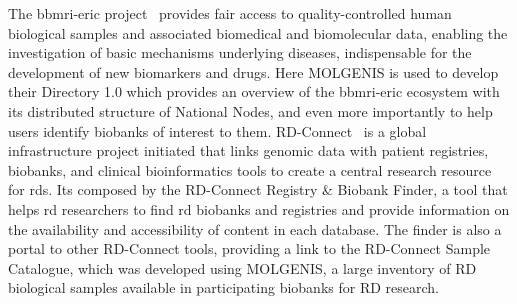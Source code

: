 The \gls{bbmri-eric} project~\cite{bbmrieric} provides fair access to
quality-controlled human biological samples and associated biomedical and biomolecular
data, enabling the investigation of basic mechanisms underlying diseases, indispensable
for the development of new biomarkers and drugs.
Here MOLGENIS is used to develop their Directory 1.0 which provides an overview of the
\gls{bbmri-eric} ecosystem with its distributed structure of National Nodes, and even more
importantly to help users identify biobanks of interest to them.
RD-Connect~\cite{rdconnect} is a global infrastructure project initiated that links
genomic data with patient registries, biobanks, and clinical bioinformatics tools to
create a central research resource for \gls{rd}s.
Its composed by the RD-Connect Registry \& Biobank Finder, a tool that helps \gls{rd}
researchers to find \gls{rd} biobanks and registries and provide information on the
availability and accessibility of content in each database.
The finder is also a portal to other RD-Connect tools, providing a link to the
RD-Connect Sample Catalogue, which was developed using MOLGENIS, a large inventory of
RD biological samples available in participating biobanks for RD research. 




